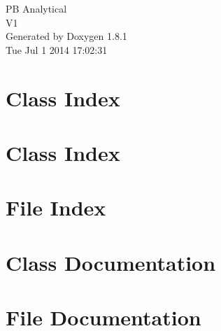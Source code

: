 \documentclass{book}
\begin{document}
\hypersetup{pageanchor=false,citecolor=blue}
\begin{titlepage}
\vspace*{7cm}
\begin{center}
{\Large P\-B Analytical \\[1ex]\large V1 }\\
\vspace*{1cm}
{\large Generated by Doxygen 1.8.1}\\
\vspace*{0.5cm}
{\small Tue Jul 1 2014 17:02:31}\\
\end{center}
\end{titlepage}
\clearemptydoublepage
{}
\tableofcontents
\clearemptydoublepage
{}
\hypersetup{pageanchor=true,citecolor=blue}
\chapter{Class Index}

\chapter{Class Index}

\chapter{File Index}

\chapter{Class Documentation}

















\chapter{File Documentation}



























\printindex
\end{document}
